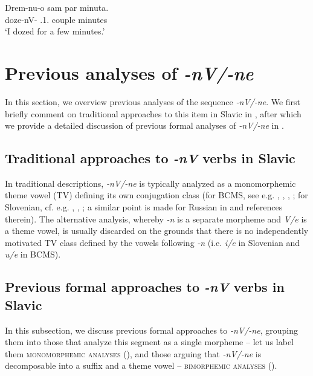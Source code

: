 \documentclass[output=paper,colorlinks,citecolor=brown]{langscibook}
\begin{document}
\ex\label{str:ex:SCDoz}
\gll Drem-nu-o sam par minuta.\\ 
doze-nV-{\PST} {\AUX.1.\SG} couple minutes \\ 
\glt `I dozed for a few minutes.'

\z

\section{Previous analyses of \textit{-nV/-ne}} \label{str:sec:previous-analyses}

In this section, we %
overview previous analyses of the sequence \textit{-nV/-ne}. We first briefly comment on traditional approaches to this item in Slavic in , after which we provide a detailed discussion of previous formal analyses of \textit{-nV/-ne} in .

\subsection{Traditional approaches to \textit{-nV} verbs in Slavic} \label{str:subsec:traditional-approaches}

In traditional descriptions, \textit{-nV/-ne} is typically analyzed as a monomorphemic theme vowel (TV) defining its own conjugation class (for BCMS, see e.g. \citealt[235]{BaricEtAl1997}, \citealt[253]{IvsicEtAl1970}, \citealt[331]{sta+:Stevanovic1986}, \citealt{StanojcicPopovic2008}; for Slovenian, cf. e.g. \citealt[116, 124]{Breznik1934}, \citealt[364]{sta+:Toporisic2000}, \citealt[64]{Vidovic2011}; a similar point is made for Russian in \citealt{Gladney2013} and references therein). The alternative analysis, whereby \textit{-n} is a separate morpheme and \textit{V/e} is a theme vowel, is usually discarded on the grounds that there is no independently motivated TV class defined by the vowels following \textit{-n} (i.e. \textit{i/e} in Slovenian and \textit{u/e} in BCMS).

\subsection{Previous formal approaches to \textit{-nV} verbs in Slavic} \label{str:subsec:previous-formal-approaches}

In this subsection, we discuss previous formal approaches to \textit{-nV/-ne}, grouping them into those that analyze this segment as a single morpheme -- let us label them \textsc{monomorphemic analyses} (), and those arguing that \textit{-nV/-ne} is decomposable into a suffix and a theme vowel -- \textsc{bimorphemic analyses} (). 
\end{document}
